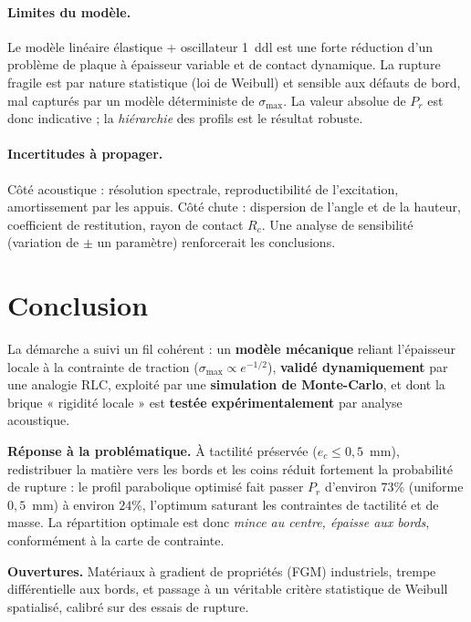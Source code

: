 \documentclass[11pt,a4paper]{article}
\begin{document}
\paragraph{Limites du modèle.}
Le modèle linéaire élastique + oscillateur 1~ddl est une forte réduction d'un
problème de plaque à épaisseur variable et de contact dynamique. La rupture
fragile est par nature statistique (loi de Weibull) et sensible aux défauts de
bord, mal capturés par un modèle déterministe de $\sigma_{\max}$. La valeur
absolue de $P_r$ est donc indicative ; la \emph{hiérarchie} des profils est le
résultat robuste.

\paragraph{Incertitudes à propager.}
Côté acoustique : résolution spectrale, reproductibilité de l'excitation,
amortissement par les appuis. Côté chute : dispersion de l'angle et de la
hauteur, coefficient de restitution, rayon de contact $R_c$. Une analyse de
sensibilité (variation de $\pm$ un paramètre) renforcerait les conclusions.

\section{Conclusion}

La démarche a suivi un fil cohérent : un \textbf{modèle mécanique} reliant
l'épaisseur locale à la contrainte de traction
($\sigma_{\max}\propto e^{-1/2}$), \textbf{validé dynamiquement} par une
analogie RLC, exploité par une \textbf{simulation de Monte-Carlo}, et dont la
brique « rigidité locale » est \textbf{testée expérimentalement} par analyse
acoustique.

\medskip
\textbf{Réponse à la problématique.} À tactilité préservée ($e_c\le 0{,}5$~mm),
redistribuer la matière vers les bords et les coins réduit fortement la
probabilité de rupture : le profil parabolique optimisé fait passer $P_r$
d'environ $73\%$ (uniforme $0{,}5$~mm) à environ $24\%$, l'optimum saturant les
contraintes de tactilité et de masse. La répartition optimale est donc
\emph{mince au centre, épaisse aux bords}, conformément à la carte de contrainte.

\medskip
\textbf{Ouvertures.} Matériaux à gradient de propriétés (FGM) industriels,
trempe différentielle aux bords, et passage à un véritable critère statistique
de Weibull spatialisé, calibré sur des essais de rupture.
\end{document}
